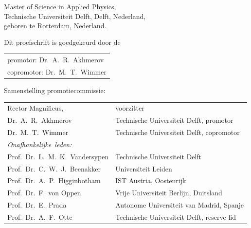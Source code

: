 \begin{titlepage}
\begin{center}
\bigskip
\bigskip

Master of Science in Applied Physics, \\
Technische Universiteit Delft, Delft, Nederland, \\
geboren te Rotterdam, Nederland.

\vspace*{2\bigskipamount}

\end{center}

\clearpage
\thispagestyle{empty}

\noindent Dit proefschrift is goedgekeurd door de

\medskip\noindent
\begin{tabular}{l}
    promotor: Dr.\ A.\ R.\ Akhmerov \\
    copromotor: Dr.\ M.\ T.\ Wimmer
\end{tabular}

\bigskip
\noindent Samenstelling promotiecommissie:

\medskip\noindent
\begin{tabular}{p{4cm}l}
    Rector Magnificus, & voorzitter \\
    Dr.\ A.\ R.\ Akhmerov & Technische Universiteit Delft, promotor \\
    Dr.\ M.\ T.\ Wimmer & Technische Universiteit Delft, copromotor \\

    \medskip
    \mbox{\emph{Onafhankelijke leden:}} & \\
    Prof.\ Dr.\ L.\ M.\ K.\ Vandersypen & Technische Universiteit Delft \\
    Prof.\ Dr.\ C.\ W.\ J.\ Beenakker & Universiteit Leiden \\
    Prof.\ Dr.\ A.\ P.\ Higginbotham & IST Austria, Oostenrijk \\
    Prof.\ Dr.\ F.\ von Oppen & Vrije Universiteit Berlijn, Duitsland \\
    Prof.\ Dr.\ E.\ Prada & Autonome Universiteit van Madrid, Spanje \\
    Prof.\ Dr.\ A.\ F.\ Otte & Technische Universiteit Delft, reserve lid

\end{tabular}



\end{titlepage}
